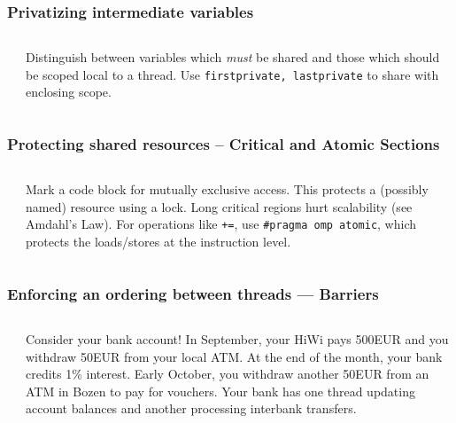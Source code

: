 \documentclass[handout]{beamer}
\begin{document}
\begin{frame}[fragile]
  \frametitle{Privatizing intermediate variables}
  \begin{columns}[t]%
    \begin{column}{0.6\textwidth}
    \end{column}
    \begin{column}{0.4\textwidth}
      Distinguish between variables which \emph{must} be shared and those which should be scoped local to a thread. Use \texttt{firstprivate, lastprivate} to share with enclosing scope. 
    \end{column}
  \end{columns}
\end{frame}


\begin{frame}[fragile]
  \frametitle{Protecting shared resources -- Critical and Atomic Sections}
  \begin{columns}[t]
    \begin{column}{0.7\textwidth}
    \end{column}
    \begin{column}{0.4\textwidth}
      Mark a code block for mutually exclusive access. This protects a (possibly named) resource using a lock. Long critical regions hurt scalability (see Amdahl's Law). For operations like \texttt{+=}, use \texttt{\#pragma omp atomic}, which protects the loads/stores at the instruction level.
      
    \end{column}
  \end{columns}
\end{frame}


\begin{frame}[fragile]
  \frametitle{Enforcing an ordering between threads --- Barriers}
  \begin{columns}[t]%
    \begin{column}{0.65\textwidth}
    \end{column}
    \begin{column}{0.4\textwidth}
      Consider your bank account! In September, your HiWi pays 500EUR and you withdraw 50EUR from your local ATM. At the end of the month, your bank credits 1\% interest. Early October, you withdraw another 50EUR from an ATM in Bozen to pay for vouchers. Your bank has one thread updating account balances and another processing interbank transfers.
    \end{column}
  \end{columns}
\end{frame}
\end{document}
